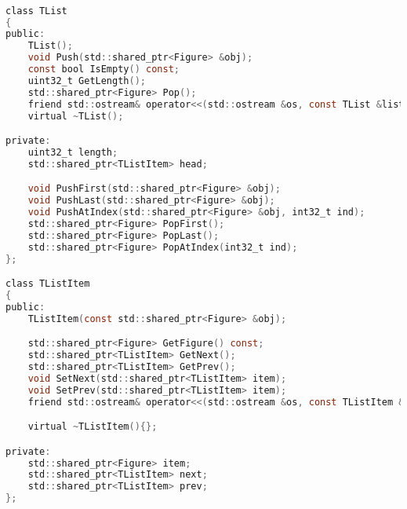 \begin{lstlisting}[language=C]

class TList
{
public:
    TList();
    void Push(std::shared_ptr<Figure> &obj);
    const bool IsEmpty() const;
    uint32_t GetLength();
    std::shared_ptr<Figure> Pop();
    friend std::ostream& operator<<(std::ostream &os, const TList &list);
    virtual ~TList();

private:
    uint32_t length;
    std::shared_ptr<TListItem> head;

    void PushFirst(std::shared_ptr<Figure> &obj);
    void PushLast(std::shared_ptr<Figure> &obj);
    void PushAtIndex(std::shared_ptr<Figure> &obj, int32_t ind);
    std::shared_ptr<Figure> PopFirst();
    std::shared_ptr<Figure> PopLast();
    std::shared_ptr<Figure> PopAtIndex(int32_t ind);
};

class TListItem
{
public:
    TListItem(const std::shared_ptr<Figure> &obj);

    std::shared_ptr<Figure> GetFigure() const;
    std::shared_ptr<TListItem> GetNext();
    std::shared_ptr<TListItem> GetPrev();
    void SetNext(std::shared_ptr<TListItem> item);
    void SetPrev(std::shared_ptr<TListItem> item);
    friend std::ostream& operator<<(std::ostream &os, const TListItem &obj);

    virtual ~TListItem(){};

private:
    std::shared_ptr<Figure> item;
    std::shared_ptr<TListItem> next;
    std::shared_ptr<TListItem> prev;
};

\end{lstlisting}


